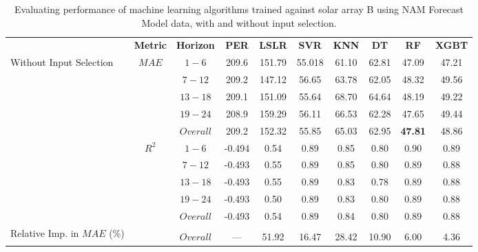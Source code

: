 \begin{table}[h]
\begin{center}
    \caption{Evaluating performance of machine learning algorithms trained against solar array B using NAM Forecast Model data, with and without input selection.}
    \vspace{0.2cm}
    \label{Tab:fs_array_b}
    \begin{tabular}{@{}p{5.3em}ccccccccc@{}}
    \toprule
    & \textbf{Metric} & \textbf{Horizon} & \textbf{PER} & \textbf{LSLR} & \textbf{SVR} & \textbf{KNN} & \textbf{DT} & \textbf{RF} & \textbf{XGBT} \\ \cmidrule(l){1-10} 
    \multirow{10}{5em}{Without Input Selection} & \multirow{5}{*}{$MAE$} & $1 - 6$ & 209.6 & 151.79 & 55.018 & 61.10 & 62.81 & 47.09 & 47.21 \\
                                              &                   & $7 - 12$ & 209.2 & 147.12 & 56.65 & 63.78 & 62.05 & 48.32 & 49.56 \\
                                              &                   & $13 - 18$ & 209.1 & 151.09 & 55.64 & 68.70 & 64.64 & 48.19 & 49.22 \\
                                              &                   & $19 - 24$ & 208.9 & 159.29 & 56.11 & 66.53 & 62.28 & 47.65 & 49.44 \\
                                              &                   & $Overall$ & 209.2 & 152.32 & 55.85 & 65.03 & 62.95 & \textbf{47.81} & 48.86 \\ \cmidrule(lr){2-10}
                                              & \multirow{5}{*}{$R^2$} & $1 - 6$ & -0.494 & 0.54 & 0.89 & 0.85 & 0.80 & 0.90 & 0.89 \\
                                              &                   & $7 - 12$ & -0.493 & 0.55 & 0.89 & 0.85 & 0.80 & 0.89 & 0.88 \\
                                              &                   & $13 - 18$ & -0.493 & 0.55 & 0.89 & 0.83 & 0.78 & 0.89 & 0.88 \\
                                              &                   & $19 - 24$ & -0.493 & 0.50 & 0.89 & 0.83 & 0.80 & 0.89 & 0.88 \\
                                              &                   & $Overall$ & -0.493 & 0.54 & 0.89 & 0.84 & 0.80 & 0.89 & 0.88 \\ 
    \midrule
    \multirow{3}{5em}{Relative Imp. in $MAE$ (\%)} & & & & & & & & & \\
    & & $Overall$ & --- & 51.92 & 16.47 & 28.42 & 10.90 & 6.00 & 4.36 \\ 

\end{tabular}
\end{center}
\end{table}
